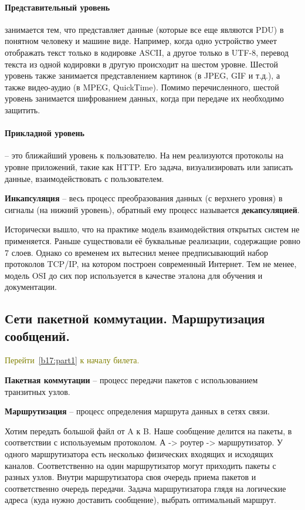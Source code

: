 \paragraph*{Представительный уровень}\label{b17:osi:lev6} занимается тем, что представляет данные (которые все еще являются PDU) в понятном человеку и машине виде. Например, когда одно устройство умеет отображать текст только в кодировке ASCII, а другое только в UTF-8, перевод текста из одной кодировки в другую происходит на шестом уровне.
Шестой уровень также занимается представлением картинок (в JPEG, GIF и т.д.), а также видео-аудио (в MPEG, QuickTime). Помимо перечисленного, шестой уровень занимается шифрованием данных, когда при передаче их необходимо защитить.

\paragraph*{Прикладной уровень}\label{b17:osi:lev7} -- это ближайший уровень к пользователю. На нем реализуются протоколы на уровне приложений, такие как HTTP.  Его задача, визуализировать или записать данные, взаимодействовать с пользователем.
\bigskip

\textbf{Инкапсуляция} -- весь процесс преобразования данных (с верхнего уровня) в сигналы (на нижний уровень), обратный ему процесс называется \textbf{декапсуляцией}.

Исторически вышло, что на практике модель взаимодействия открытых систем не применяется. Раньше существовали её буквальные реализации, содержащие ровно 7 слоев. Однако со временем их вытеснил менее предписывающий набор протоколов TCP/IP, на котором построен современный Интернет. Тем не менее, модель OSI до сих пор используется в качестве эталона для обучения и документации.


\subsection*{Сети пакетной коммутации. Маршрутизация сообщений.}\label{b17:part2}

\textcolor{olive}{Перейти~\ref{b17:part1} к началу билета.}

\textbf{Пакетная коммутации} -- процесс передачи пакетов с использованием транзитных узлов.

\textbf{Маршрутизация} -- процесс определения маршрута данных в сетях связи.

Хотим передать большой файл от A к B. Наше сообщение делится на пакеты, в соответствии с используемым протоколом.
А -> роутер -> маршрутизатор.
У одного маршрутизатора есть несколько физических входящих и исходящих каналов. Соответственно на один маршрутизатор могут приходить пакеты с разных узлов. Внутри маршрутизатора своя очередь приема пакетов и соответственно очередь передачи.
Задача маршрутизатора глядя на логические адреса (куда нужно доставить сообщение), выбрать оптимальный маршрут.

